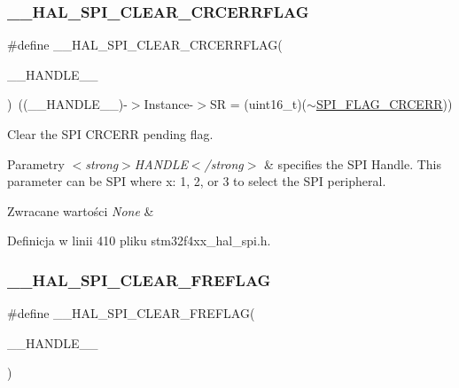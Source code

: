 \subsubsection{\texorpdfstring{\+\_\+\+\_\+\+H\+A\+L\+\_\+\+S\+P\+I\+\_\+\+C\+L\+E\+A\+R\+\_\+\+C\+R\+C\+E\+R\+R\+F\+L\+AG}{\_\_HAL\_SPI\_CLEAR\_CRCERRFLAG}}
{\footnotesize\ttfamily \#define \+\_\+\+\_\+\+H\+A\+L\+\_\+\+S\+P\+I\+\_\+\+C\+L\+E\+A\+R\+\_\+\+C\+R\+C\+E\+R\+R\+F\+L\+AG(\begin{DoxyParamCaption}\item[{}]{\+\_\+\+\_\+\+H\+A\+N\+D\+L\+E\+\_\+\+\_\+ }\end{DoxyParamCaption})~((\+\_\+\+\_\+\+H\+A\+N\+D\+L\+E\+\_\+\+\_\+)-\/$>$Instance-\/$>$SR = (uint16\+\_\+t)($\sim$\hyperlink{group___s_p_i___flags__definition_ga30fb6af50e1f3c61cb9de76b0101c889}{S\+P\+I\+\_\+\+F\+L\+A\+G\+\_\+\+C\+R\+C\+E\+RR}))}



Clear the S\+PI C\+R\+C\+E\+RR pending flag. 


\begin{DoxyParams}{Parametry}
{\em $<$strong$>$\+H\+A\+N\+D\+L\+E$<$/strong$>$} & specifies the S\+PI Handle. This parameter can be S\+PI where x\+: 1, 2, or 3 to select the S\+PI peripheral. \\
\hline
\end{DoxyParams}

\begin{DoxyRetVals}{Zwracane wartości}
{\em None} & \\
\hline
\end{DoxyRetVals}


Definicja w linii 410 pliku stm32f4xx\+\_\+hal\+\_\+spi.\+h.

\mbox{\label{group___s_p_i___exported___macros_ga7ff182f5cf6c731318c882351d6d7ac2}} 
\subsubsection{\texorpdfstring{\+\_\+\+\_\+\+H\+A\+L\+\_\+\+S\+P\+I\+\_\+\+C\+L\+E\+A\+R\+\_\+\+F\+R\+E\+F\+L\+AG}{\_\_HAL\_SPI\_CLEAR\_FREFLAG}}
{\footnotesize\ttfamily \#define \+\_\+\+\_\+\+H\+A\+L\+\_\+\+S\+P\+I\+\_\+\+C\+L\+E\+A\+R\+\_\+\+F\+R\+E\+F\+L\+AG(\begin{DoxyParamCaption}\item[{}]{\+\_\+\+\_\+\+H\+A\+N\+D\+L\+E\+\_\+\+\_\+ }\end{DoxyParamCaption})}

